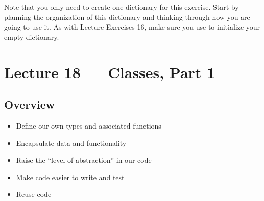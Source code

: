 \documentclass[letterpaper,10pt,english]{sphinxmanual}
\begin{document}
\begin{enumerate}
%
\begin{sphinxVerbatim}[commandchars=\\\{\}]
        
 
\end{sphinxVerbatim}

Note that you only need to create one dictionary for this
exercise.  Start by planning the organization of this dictionary
and thinking through how you are going to use it. As with Lecture Exercises
16, make sure you use  to initialize your empty dictionary.

\end{enumerate}


\chapter{Lecture 18 — Classes, Part 1}
\label{\detokenize{lecture_notes/lec18_classes1:lecture-18-classes-part-1}}\label{\detokenize{lecture_notes/lec18_classes1::doc}}

\section{Overview}
\label{\detokenize{lecture_notes/lec18_classes1:overview}}\begin{itemize}
\item {} 
Define our own types and associated functions

\item {} 
Encapsulate data and functionality

\item {} 
Raise the “level of abstraction” in our code

\item {} 
Make code easier to write and test

\item {} 
Reuse code

\end{itemize}
\end{document}

